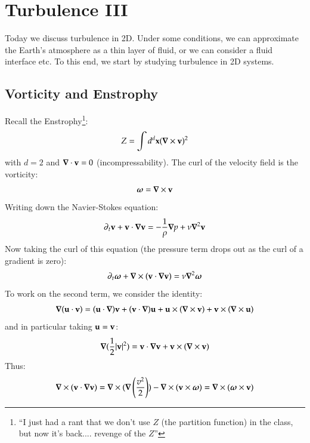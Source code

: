 \section{Turbulence III}
Today we discuss turbulence in 2D. Under some conditions, we can approximate the Earth's atmosphere as a thin layer of fluid, or we can consider a fluid interface etc. To this end, we start by studying turbulence in 2D systems.

\subsection{Vorticity and Enstrophy}
Recall the Enstrophy\footnote{``I just had a rant that we don't use $Z$ (the partition function) in the class, but now it's back.... revenge of the $Z$''}:
\begin{equation}
    Z = \int d^d\v{x}(\nabla \times \v{v})^2
\end{equation}
with $d = 2$ and $\nabla \cdot \v{v} = 0$ (incompressability). The curl of the velocity field is the vorticity:
\begin{equation}
    \gv{\omega} = \nabla \times \v{v}
\end{equation}
Writing down the Navier-Stokes equation:
\begin{equation}
    \p_t \v{v} + \v{v} \cdot \nabla \v{v} = -\frac{1}{\rho}\nabla p + \nu \nabla^2\v{v}
\end{equation}
Now taking the curl of this equation (the pressure term drops out as the curl of a gradient is zero):
\begin{equation}
    \p_t \gv{\omega} + \nabla \times (\v{v} \cdot \nabla \v{v}) = \nu \nabla^2 \gv{\omega}
\end{equation}
To work on the second term, we consider the identity:
\begin{equation}
    \nabla(\v{u} \cdot \v{v}) = (\v{u} \cdot \nabla)\v{v} + (\v{v} \cdot \nabla)\v{u} + \v{u} \times (\nabla \times \v{v}) + \v{v}\times (\nabla \times \v{u})
\end{equation}
and in particular taking $\mathbf{u} = \mathbf{v}$:
\begin{equation}
    \nabla(\frac{1}{2}\abs{\v{v}}^2) = \v{v} \cdot \nabla \v{v} + \v{v} \times (\nabla \times \v{v})
\end{equation}
Thus:
\begin{equation}
    \nabla \times (\v{v} \cdot \nabla \v{v}) = \nabla \times (\nabla\left(\frac{v^2}{2}\right)) - \nabla \times (\v{v} \times \gv{\omega}) = \nabla \times (\gv{\omega} \times \v{v})
\end{equation}

